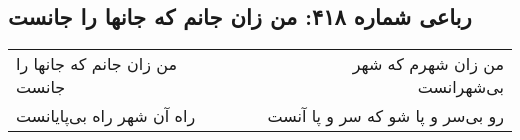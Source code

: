 \begin{center}
\section*{رباعی شماره ۴۱۸: من زان جانم که جانها را جانست}
\label{sec:0418}
\begin{longtable}{l p{0.5cm} r}
من زان جانم که جانها را جانست
&&
من زان شهرم که شهر بی‌شهرانست
\\
راه آن شهر راه بی‌پایانست
&&
رو بی‌سر و پا شو که سر و پا آنست
\\
\end{longtable}
\end{center}
